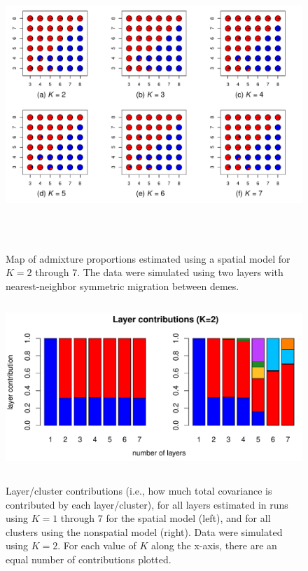 \documentclass[12pt]{article}
\begin{document}
\begin{figure}
	\centering
		{\includegraphics[width=6in,height=4in]{figs/sims/simK2_sp_pies.pdf}}
	\caption{
	Map of admixture proportions estimated using a spatial model for $K=2$ through 7.
	The data were simulated using two layers with nearest-neighbor symmetric migration between demes.
    }\label{simK2_sp_pies}
\end{figure}

\begin{figure}
	\centering
		{\includegraphics[width=5in,height=2.5in]{figs/sims/simK2_laycon_barplots.pdf}}
		\caption{
			Layer/cluster contributions (i.e., how much total covariance is contributed by each layer/cluster), 
			for all layers estimated in runs using $K = 1$ through 7 
			for the spatial model (left), 
			and for all clusters using the nonspatial model (right).
			Data were simulated using $K=2$.
			For each value of $K$ along the x-axis, there are an equal number of contributions plotted.
		}\label{simK2_laycon}
\end{figure}
\end{document}
